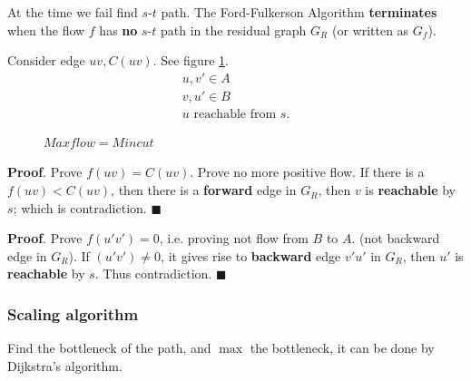 \documentclass[a4paper]{report}
\theoremstyle{definition}
\begin{document}
At the time we fail find $s$-$t$ path. The Ford-Fulkerson Algorithm \textbf{terminates} when the flow $f$ has \textbf{no} $s$-$t$ path in the residual graph $G_R$ (or written as $G_f$).

Consider edge $uv, C(uv)$. See figure \ref{fig:7_5}.
\begin{align*}
u,v' \in A\\
v,u' \in B \\
u \text{ reachable from } s.
\end{align*}
\begin{figure}[!htp]
\centering
{}
\caption{$Maxflow = Mincut$}
\label{fig:7_5}
\end{figure}

\textbf{Proof}. Prove $f(uv)=C(uv)$. Prove no more positive flow. If there is a $f(uv)< C(uv)$, then there is a \textbf{forward} edge in $G_R$, then $v$ is \textbf{reachable} by $s$; which is contradiction. $\blacksquare$

\textbf{Proof}. Prove $f(u'v')=0$, i.e. proving not flow from $B$ to $A$. (not backward edge in $G_R$). If $(u'v')\neq 0$, it gives rise to \textbf{backward} edge $v'u'$ in $G_R$, then $u'$ is \textbf{reachable} by $s$. Thus contradiction. $\blacksquare$
\subsubsection{Scaling algorithm}
Find the bottleneck of the path, and $\max$ the bottleneck, it can be done by Dijkstra's algorithm.
\end{document}
